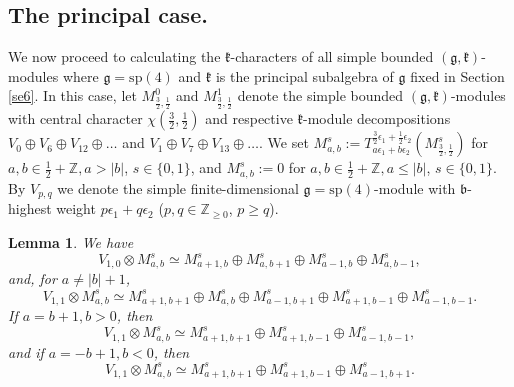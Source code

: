 \documentclass[12pt]{amsart}
\theoremstyle{plain} %
\newtheorem{lemma}[definition]{Lemma}
\renewcommand{\sp}{\mathrm{sp}}
\newcommand {\ZZ} {\mathbb {Z}}
\newcommand{\kk}{\mathfrak{k}}
\renewcommand{\gg}{\mathfrak{g}}
\newcommand{\bb}{\mathfrak{b}}
\newcommand {\MM} {\mathscr {M}}
\newcommand{\eps}{\epsilon}
\newcommand{\half}{\frac{1}{2}}
\newcommand{\threehalfs}{\frac{3}{2}}
\newcommand {\eqdef} {:=}
\newcommand{\refse}[1]{Section~ \ref{#1}}
\begin{document}
\subsection{The principal case.}
We now proceed to calculating the $\kk$-characters of all simple bounded $(\gg,\kk)$-modules where $\gg=\sp(4)$ and $\kk$ is the principal subalgebra of $\gg$ fixed in \refse{se6}. In this case, let $M_{\threehalfs,\half}^0$ and $M_{\threehalfs,\half}^1$ denote the simple bounded $(\gg,\kk)$-modules with central character $\chi (\threehalfs,\half)$ and respective $\kk$-module decompositions $V_0\oplus V_6\oplus V_{12}\oplus\dots$ and  $V_1\oplus V_7\oplus V_{13}\oplus\dots$. We set $M_{a,b}^s \eqdef T_{a\eps_1+b\eps_2}^{\threehalfs\eps_1+\half\eps_2}(M_{\threehalfs,\half}^s)$ for $a,b\in\half+\ZZ, a>|b|$, $s\in\{0,1\}$, and $M_{a,b}^s:=0$ for $a,b\in\half+\ZZ, a\leq|b|$, $s\in\{0,1\}$. By $V_{p,q}$ we denote the simple finite-dimensional $\gg=\sp(4)$-module with $\bb$-highest weight $p\eps_1+q\eps_2$ ($p,q\in \ZZ_{\geq 0}$, $p\geq q$).
\begin {lemma}\label{le200}
We have
\begin{equation}\label{eq1155}
V_{1,0}\otimes M_{a,b}^s \simeq M_{a+1,b}^s\oplus M_{a,b+1}^s\oplus M_{a-1,b}^s\oplus M_{a,b-1}^s,
\end{equation}
and, for $a\neq |b|+1$,
\begin{equation}\label{starstar}
V_{1,1}\otimes M_{a,b}^s \simeq M_{a+1,b+1}^s\oplus M_{a,b}^s\oplus M_{a-1,b+1}^s\oplus M_{a+1,b-1}^s\oplus M_{a-1,b-1}^s.
\end{equation}
If $a=b+1,b>0$, then
\begin{equation}\label{star1star}
V_{1,1}\otimes M_{a,b}^s\simeq M_{a+1,b+1}^s\oplus M_{a+1,b-1}^s
\oplus M_{a-1,b-1}^s,
\end{equation}
and if $a=-b+1,b<0$, then
\begin{equation}\label{star2star}
 V_{1,1}\otimes M_{a,b}^s\simeq M_{a+1,b+1}^s\oplus M_{a+1,b-1}^s
\oplus M_{a-1,b+1}^s.
\end{equation}
\end{lemma}
\newcommand{\mabs}{\MM_{a,b}^s}
\end{document}
